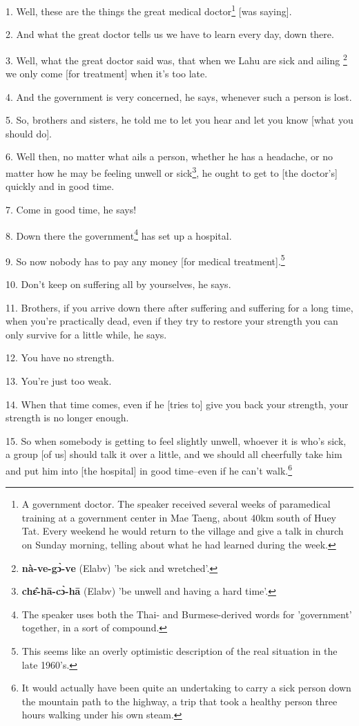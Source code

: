 \setcounter{footnote}{0}


1. Well, these are the things the great medical doctor\footnote{A government doctor. The speaker received several weeks of paramedical training at a government center in Mae Taeng, about 40km south of Huey Tat. Every weekend he would return to the village and give a talk in church on Sunday morning, telling about what he had learned during the week.} [was saying].

2. And what the great doctor tells us we have to learn every day, down there.

3. Well, what the great doctor said was, that when we Lahu are sick and ailing
\footnote{\textbf{nà-ve-gɔ̀-ve} (Elabv) 'be sick and wretched'.} we only come [for treatment] when it's too late.

4. And the government is very concerned, he says, whenever such a person is lost.

5. So, brothers and sisters, he told me to let you hear and let you know [what
you should do].

6. Well then, no matter what ails a person, whether he has a headache, or no matter
how he may be feeling unwell or sick\footnote{\textbf{chɛ̂-hā-cɔ̀-hā} (Elabv) 'be unwell and having a hard time'.}, he ought to get to [the doctor's] quickly
and in good time.

7. Come in good time, he says!

8. Down there the government\footnote{The speaker uses both the Thai- and Burmese-derived words for 'government' together, in a sort of compound.} has set up a hospital.

9. So now nobody has to pay any money [for medical treatment].\footnote{This seems like an overly optimistic description of the real situation in the late 1960's.}

10. Don't keep on suffering all by yourselves, he says.

11. Brothers, if you arrive down there after suffering and suffering for a long
time, when you're practically dead, even if they try to restore your strength you
can only survive for a little while, he says.

12. You have no strength.

13. You're just too weak.

14. When that time comes, even if he [tries to] give you back your strength, your
strength is no longer enough.

15. So when somebody is getting to feel slightly unwell, whoever it is who's sick,
a group [of us] should talk it over a little, and we should all cheerfully take
him and put him into [the hospital] in good time--even if he can't walk.\footnote{It would actually have been quite an undertaking to carry a sick person down the mountain path to the highway, a trip that took a healthy person three hours walking under his own steam.}

